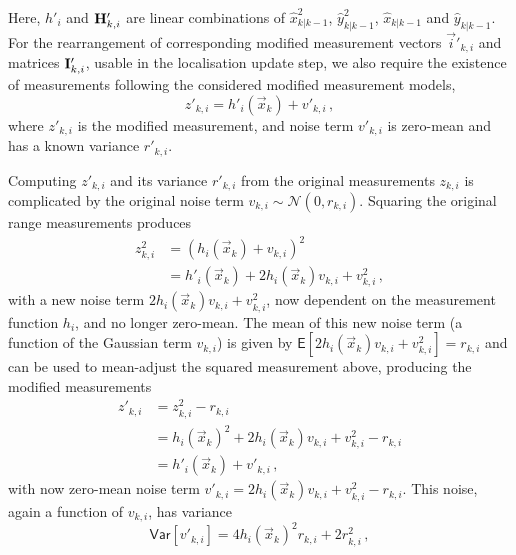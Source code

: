 Here, $h'_i$ and ${{\mathbf{H}}}'_{k,i}$ are linear combinations of $\hat{x}_{k|k-1}^2$, $\hat{y}_{k|k-1}^2$, $\hat{x}_{k|k-1}$ and $\hat{y}_{k|k-1}$. For the rearrangement of corresponding modified measurement vectors $\vec{i}'_{k, i}$ and matrices ${{\mathbf{I}}}'_{k, i}$, usable in the localisation update step, we also require the existence of measurements following the considered modified measurement models,
\begin{equation}\label{eq:nonlin_fusion:modified_measurement_model}
    z'_{k,i} = h'_i(\vec{x}_k)+v'_{k,i}\,,
\end{equation}
where $z'_{k,i}$ is the modified measurement, and noise term $v'_{k,i}$ is zero-mean and has a known variance $r'_{k,i}$.

Computing $z'_{k,i}$ and its variance $r'_{k,i}$ from the original measurements $z_{k,i}$ is complicated by the original noise term $v_{k,i} \sim \mathcal{N}(0, r_{k,i})$. Squaring the original range measurements produces
\begin{equation}
    \begin{split}
        z_{k,i}^2 &= (h_i(\vec{x}_k) + v_{k,i})^2 \\
        &= h'_i(\vec{x}_k) + 2h_i(\vec{x}_k)v_{k,i} + v_{k,i}^2\,,
    \end{split}
\end{equation}
with a new noise term $2h_i(\vec{x}_k)v_{k,i} + v_{k,i}^2$, now dependent on the measurement function $h_i$, and no longer zero-mean. The mean of this new noise term (a function of the Gaussian term $v_{k, i}$) is given by $\mathsf{E}[2h_i(\vec{x}_k)v_{k, i} + v_{k, i}^2] = r_{k, i}$ and can be used to mean-adjust the squared measurement above, producing the modified measurements
\begin{equation}\label{eq:nonlin_fusion:modified_measurement}
    \begin{split}
        z'_{k,i} &= z_{k,i}^2 - r_{k,i} \\
        &= h_i(\vec{x}_k)^2 + 2h_i(\vec{x}_k)v_{k,i} + v_{k,i}^2 - r_{k,i} \\
        &= h'_i(\vec{x}_k) + v'_{k,i}\,,
    \end{split}
\end{equation}
with now zero-mean noise term $v'_{k,i} = 2h_i(\vec{x}_k)v_{k,i} + v_{k,i}^2 - r_{k,i}$. This noise, again a function of $v_{k,i}$, has variance 
\begin{equation}\label{eq:nonlin_fusion:modified_measurement_variance}
    \mathsf{Var}[v'_{k,i}] = 4h_i(\vec{x}_k)^2r_{k,i} + 2r_{k,i}^2\,,
\end{equation}
